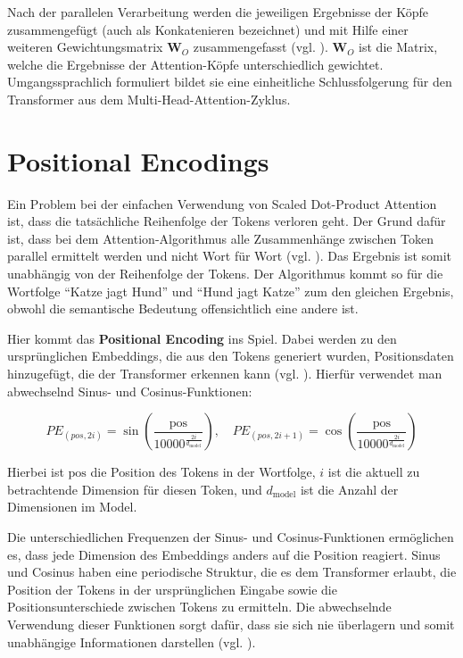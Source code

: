 Nach der parallelen Verarbeitung werden die jeweiligen Ergebnisse der Köpfe zusammengefügt (auch als Konkatenieren bezeichnet) und mit Hilfe einer weiteren Gewichtungsmatrix \( \mathbf{W}_{O} \) zusammengefasst (vgl. \cite[S. 5]{attention}).  
\( \mathbf{W}_{O} \) ist die Matrix, welche die Ergebnisse der Attention-Köpfe unterschiedlich gewichtet.  
Umgangssprachlich formuliert bildet sie eine einheitliche Schlussfolgerung für den Transformer aus dem Multi-Head-Attention-Zyklus.

\section{Positional Encodings}

Ein Problem bei der einfachen Verwendung von Scaled Dot-Product Attention ist, dass die tatsächliche Reihenfolge der Tokens verloren geht.  
Der Grund dafür ist, dass bei dem Attention-Algorithmus alle Zusammenhänge zwischen Token parallel ermittelt werden und nicht Wort für Wort (vgl. \cite[S. 6]{attention}).   
Das Ergebnis ist somit unabhängig von der Reihenfolge der Tokens.
Der Algorithmus kommt so für die Wortfolge \enquote{Katze jagt Hund} und \enquote{Hund jagt Katze} zum den gleichen Ergebnis, obwohl die semantische Bedeutung offensichtlich eine andere ist. 

Hier kommt das \textbf{Positional Encoding} ins Spiel.  
Dabei werden zu den ursprünglichen Embeddings, die aus den Tokens generiert wurden, Positionsdaten hinzugefügt, die der Transformer erkennen kann (vgl. \cite[S. 6]{attention}).  
Hierfür verwendet man abwechselnd Sinus- und Cosinus-Funktionen:

\[
PE_{(pos, 2i)} = \sin\left(\frac{\text{pos}}{10000^{\frac{2i}{d_{\text{model}}}}}\right), \quad
PE_{(pos, 2i+1)} = \cos\left(\frac{\text{pos}}{10000^{\frac{2i}{d_{\text{model}}}}}\right)
\]

Hierbei ist \( \text{pos} \) die Position des Tokens in der Wortfolge, \( i \) ist die aktuell zu betrachtende Dimension für diesen Token, und \( d_{\text{model}} \) ist die Anzahl der Dimensionen im Model.

Die unterschiedlichen Frequenzen der Sinus- und Cosinus-Funktionen ermöglichen es, dass jede Dimension des Embeddings anders auf die Position reagiert.  
Sinus und Cosinus haben eine periodische Struktur, die es dem Transformer erlaubt, die Position der Tokens in der ursprünglichen Eingabe sowie die Positionsunterschiede zwischen Tokens zu ermitteln.  
Die abwechselnde Verwendung dieser Funktionen sorgt dafür, dass sie sich nie überlagern und somit unabhängige Informationen darstellen (vgl. \cite[S. 208]{paass.2020}).

